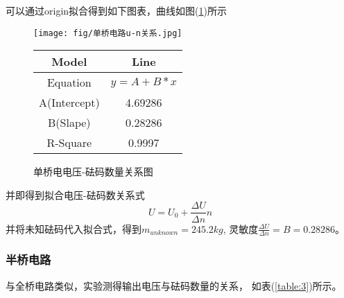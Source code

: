 \documentclass[a4paper,UTF8]{ctexart}
\begin{document}
    可以通过origin拟合得到如下图表，曲线如图(\ref*{fig:6})所示

\begin{figure}[!hp]
    \vspace{-10pt}
    \begin{minipage}{0.65\linewidth}
        \centering
        \texttt{[image: fig/单桥电路u-n关系.jpg]}   
        \label{fig:6}
    \end{minipage}
    \hfill
    \begin{minipage}{0.3\linewidth}
        \begin{center}
            \begin{tabular}{c|c}
                \hline
                Model & Line\\
                \hline
                Equation & $y=A+B*x$\\
                \hline
                A(Intercept) & 4.69286\\
                \hline
                B(Slape) & 0.28286\\
                \hline
                R-Square & 0.9997\\
                \hline
            \end{tabular}
        \end{center}
    \end{minipage}
    \caption{单桥电电压-砝码数量关系图}
\end{figure}

并即得到拟合电压-砝码数关系式
\begin{equation*}
    U = U_0+\frac{\Delta U}{\Delta n}n
\end{equation*}
并将未知砝码代入拟合式，得到$m_{unknown}=245.2kg$,
灵敏度$\frac{\Delta U}{\Delta n}=B=0.28286$。
\newpage
\subsubsection*{半桥电路}
    与全桥电路类似，实验测得输出电压与砝码数量的关系，
如表(\ref*{table:3})所示。
\end{document}
